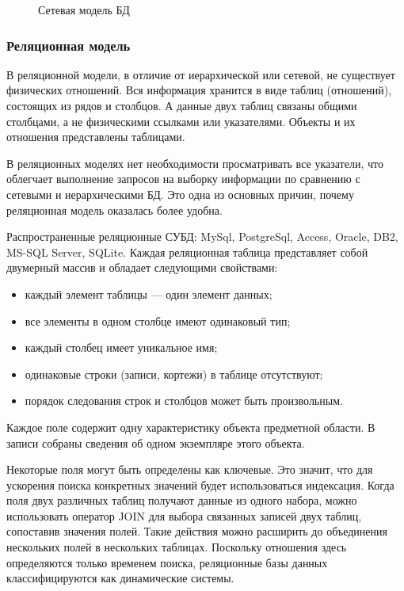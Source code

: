 \begin{figure}[h]
\caption{Сетевая модель БД}
\label{fig:image}
\end{figure}

\subsubsection{Реляционная модель}
 \setcounter{subsubsection}{3}

В реляционной модели, в отличие от иерархической или сетевой, не существует физических отношений. Вся информация хранится в виде таблиц (отношений), состоящих из рядов и столбцов. А данные двух таблиц связаны общими столбцами, а не физическими ссылками или указателями. Объекты и их отношения представлены таблицами.

В реляционных моделях нет необходимости просматривать все указатели, что облегчает выполнение запросов на выборку информации по сравнению с сетевыми и иерархическими БД. Это одна из основных причин, почему реляционная модель оказалась более удобна.

Распространенные реляционные СУБД: MySql, PostgreSql, Access, Oracle, DB2, MS-SQL Server, SQLite.
Каждая реляционная таблица представляет собой двумерный массив и обладает следующими свойствами:

\begin{itemize}
	\item каждый элемент таблицы — один элемент данных;
	\item все элементы в одном столбце имеют одинаковый тип;
	\item каждый столбец имеет уникальное имя;
	\item одинаковые строки (записи, кортежи) в таблице отсутствуют;
	\item порядок следования строк и столбцов может быть произвольным.
\end{itemize}

Каждое поле содержит одну характеристику объекта предметной области. В записи собраны сведения об одном экземпляре этого объекта.

Некоторые поля могут быть определены как ключевые. Это значит, что для ускорения поиска конкретных значений будет использоваться индексация. Когда поля двух различных таблиц получают данные из одного набора, можно использовать оператор JOIN для выбора связанных записей двух таблиц, сопоставив значения полей. Такие действия можно расширить до объединения нескольких полей в нескольких таблицах. Поскольку отношения здесь определяются только временем поиска, реляционные базы данных классифицируются как динамические системы. 

